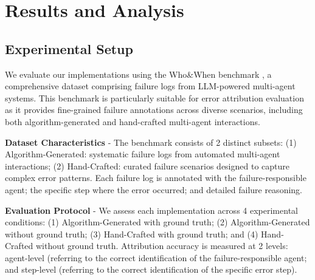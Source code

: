 \documentclass{article}
\begin{document}
\section{Results and Analysis}
\subsection{Experimental Setup}

We evaluate our implementations using the Who\&When benchmark \cite{zhang2025agent}, a comprehensive dataset comprising failure logs from LLM-powered multi-agent systems. This benchmark is particularly suitable for error attribution evaluation as it provides fine-grained failure annotations across diverse scenarios, including both algorithm-generated and hand-crafted multi-agent interactions.

\textbf{Dataset Characteristics} - The benchmark consists of 2 distinct subsets: (1) Algorithm-Generated: systematic failure logs from automated multi-agent interactions; (2) Hand-Crafted: curated failure scenarios designed to capture complex error patterns. Each failure log is annotated with the failure-responsible agent; the specific step where the error occurred; and detailed failure reasoning.

\textbf{Evaluation Protocol} - We assess each implementation across 4 experimental conditions: (1) Algorithm-Generated with ground truth; (2) Algorithm-Generated without ground truth; (3) Hand-Crafted with ground truth; and (4) Hand-Crafted without ground truth. Attribution accuracy is measured at 2 levels: agent-level (referring to the correct identification of the failure-responsible agent; and step-level (referring to the correct identification of the specific error step).


\end{document}
